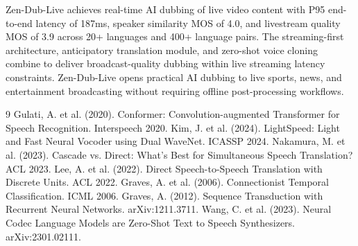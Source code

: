 \documentclass[11pt,a4paper]{article}
\begin{document}
Zen-Dub-Live achieves real-time AI dubbing of live video content with P95 end-to-end latency of 187ms, speaker similarity MOS of 4.0, and livestream quality MOS of 3.9 across 20+ languages and 400+ language pairs. The streaming-first architecture, anticipatory translation module, and zero-shot voice cloning combine to deliver broadcast-quality dubbing within live streaming latency constraints. Zen-Dub-Live opens practical AI dubbing to live sports, news, and entertainment broadcasting without requiring offline post-processing workflows.

\begin{thebibliography}{9}
 Gulati, A. et al. (2020). Conformer: Convolution-augmented Transformer for Speech Recognition. Interspeech 2020.
 Kim, J. et al. (2024). LightSpeed: Light and Fast Neural Vocoder using Dual WaveNet. ICASSP 2024.
 Nakamura, M. et al. (2023). Cascade vs. Direct: What's Best for Simultaneous Speech Translation? ACL 2023.
 Lee, A. et al. (2022). Direct Speech-to-Speech Translation with Discrete Units. ACL 2022.
 Graves, A. et al. (2006). Connectionist Temporal Classification. ICML 2006.
 Graves, A. (2012). Sequence Transduction with Recurrent Neural Networks. arXiv:1211.3711.
 Wang, C. et al. (2023). Neural Codec Language Models are Zero-Shot Text to Speech Synthesizers. arXiv:2301.02111.
\end{thebibliography}
\end{document}
